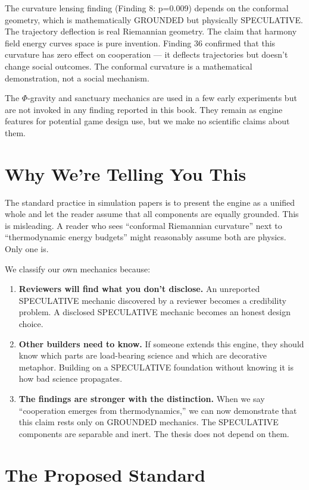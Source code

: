 The curvature lensing finding (Finding 8: p=0.009) depends on the conformal geometry, which is mathematically GROUNDED but physically SPECULATIVE. The trajectory deflection is real Riemannian geometry. The claim that harmony field energy curves space is pure invention. Finding 36 confirmed that this curvature has zero effect on cooperation --- it deflects trajectories but doesn't change social outcomes. The conformal curvature is a mathematical demonstration, not a social mechanism.

The $\Phi$-gravity and sanctuary mechanics are used in a few early experiments but are not invoked in any finding reported in this book. They remain as engine features for potential game design use, but we make no scientific claims about them.

\section{Why We're Telling You This}\label{why-were-telling-you-this}

The standard practice in simulation papers is to present the engine as a unified whole and let the reader assume that all components are equally grounded. This is misleading. A reader who sees ``conformal Riemannian curvature'' next to ``thermodynamic energy budgets'' might reasonably assume both are physics. Only one is.

We classify our own mechanics because:

\begin{enumerate}
\def\labelenumi{\arabic{enumi}.}
\item
  \textbf{Reviewers will find what you don't disclose.} An unreported SPECULATIVE mechanic discovered by a reviewer becomes a credibility problem. A disclosed SPECULATIVE mechanic becomes an honest design choice.
\item
  \textbf{Other builders need to know.} If someone extends this engine, they should know which parts are load-bearing science and which are decorative metaphor. Building on a SPECULATIVE foundation without knowing it is how bad science propagates.
\item
  \textbf{The findings are stronger with the distinction.} When we say ``cooperation emerges from thermodynamics,'' we can now demonstrate that this claim rests only on GROUNDED mechanics. The SPECULATIVE components are separable and inert. The thesis does not depend on them.
\end{enumerate}

\section{The Proposed Standard}\label{the-proposed-standard}

